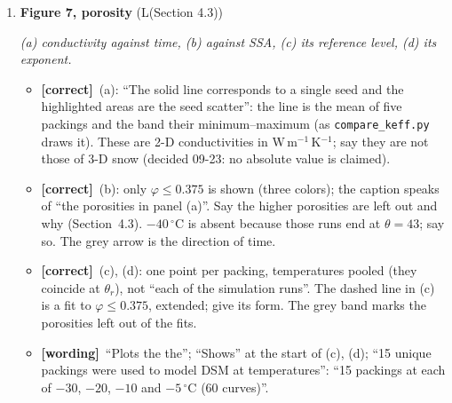 \documentclass[11pt]{article}
\newcommand{\Pg}[3]{\item \textbf{#1} {\small(#2)}\par\textit{#3}}
\newcommand{\tC}{\textcolor{miss}{\textbf{[correct]}}\ }
\newcommand{\tG}{\textcolor{stale}{\textbf{[wording]}}\ }
\newcommand{\tA}{\textcolor{have}{\textbf{[add]}}\ }
\begin{document}
\begin{enumerate}
  \begin{itemize}
  \item \tC (a): ``$|\sigma| \le 0.31$'': the colorbar says
    $0.34\times10^{-4}$. The factor $10^{-4}$ is missing from the caption.
  \item \tA Which packing (it appears to be the $\varphi = 0.325$ packing of
    Figure~5; say so) and that the frames are at $-20\,^{\circ}$C, at 0,
    10.2, 19.5 and 30.0 days.
  \item \tA Define $\theta = t/\tau_{\mathrm{sub}}$ and $\theta_r = 30$ (the
    dotted line). Say why the curves in (b) start at different values: each
    is normalized at $\theta_r$, which falls at a different time at each
    temperature.
  \item \tA (c), (d): the five curves overlie (within 0.3\%); that is the
    result, and the caption can say it. Axes start at $\theta = 1$
    (log scale).
  \item \tG ``preformed'' (performed); ``2.0mm'' (2.0~mm); ``The vertical
    axis is $k_{\mathrm{eff}}$, average value of $k_{xx}$ and $k_{yy}$, is
    normalized'': ``$k_{\mathrm{eff}} = (k_{xx}+k_{yy})/2$, normalized
    \ldots''. ``Shows the same curves plotted for'': ``(c) The same curves
    against''.
  \end{itemize}
\Pg{Figure 7, porosity}{L(Section 4.3)}{(a) conductivity against time, (b) against SSA, (c) its reference level, (d) its exponent.}
  \begin{itemize}
  \item \tC (a): ``The solid line corresponds to a single seed and the
    highlighted areas are the seed scatter'': the line is the mean of five
    packings and the band their minimum--maximum (as
    \texttt{compare\_keff.py} draws it).
    These are 2-D conductivities in W\,m$^{-1}$\,K$^{-1}$; say they are not
    those of 3-D snow (decided 09-23: no absolute value is claimed).
  \item \tC (b): only $\varphi \le 0.375$ is shown (three colors); the
    caption speaks of ``the porosities in panel (a)''. Say the higher
    porosities are left out and why (Section~4.3). $-40\,^{\circ}$C is
    absent because those runs end at $\theta = 43$; say so. The grey arrow
    is the direction of time.
  \item \tC (c), (d): one point per packing, temperatures pooled (they
    coincide at $\theta_r$), not ``each of the simulation runs''. The dashed
    line in (c) is a fit to $\varphi \le 0.375$, extended; give its form.
    The grey band marks the porosities left out of the fits.
  \item \tG ``Plots the the''; ``Shows'' at the start of (c), (d); ``15
    unique packings were used to model DSM at temperatures'': ``15 packings
    at each of $-30$, $-20$, $-10$ and $-5\,^{\circ}$C (60 curves)''.
  \end{itemize}
\end{enumerate}
\end{document}
